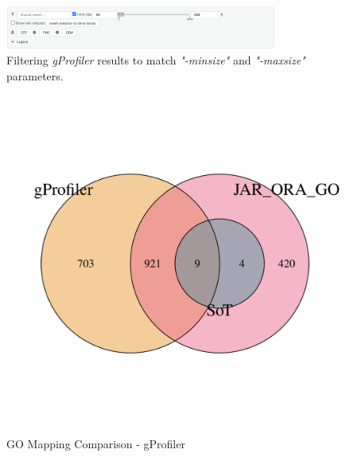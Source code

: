 \documentclass[12pt]{article}
\begin{document}
\begin{figure}[htpb]
    \centering
    \includegraphics[width=0.8\textwidth]{./screenshots/gProfiler.png}
    \caption{Filtering \textit{gProfiler} results to match \textit{"-minsize"} and \textit{"-maxsize"} parameters.}
    \label{fig:-screenshots-gProfiler-png}
\end{figure}
\begin{figure}[htpb]
    \centering
    \begin{minipage}{0.49\textwidth}
        \centering
        \includegraphics[width=\textwidth]{./plots/go_mappingCompgProfiler.png}
        \caption{GO Mapping Comparison - gProfiler}
        \label{fig:go-mapping-gprofiler}
    \end{minipage}
    \hfill
    \begin{minipage}{0.49\textwidth}
        \centering

\end{minipage}
\end{figure}
\end{document}
